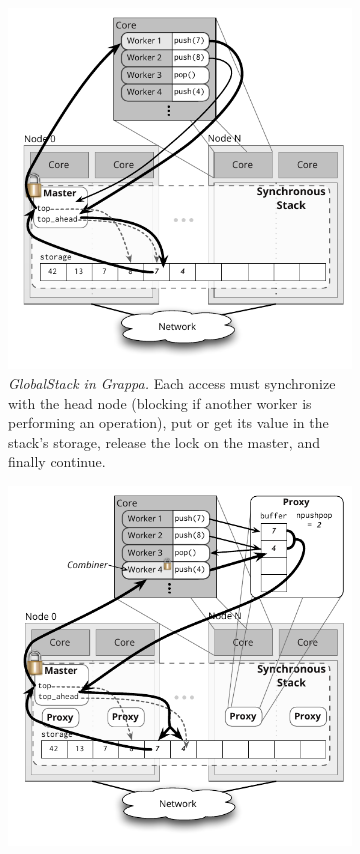 \begin{figure}[t]
  \centering
  \begin{subfigure}[b]{0.43\textwidth}
    \includegraphics[width=\textwidth]{figs/stack_nofc.pdf}
    \caption{\emph{GlobalStack in Grappa.} Each access must synchronize with the head node (blocking if another worker is performing an operation), put or get its value in the stack's storage, release the lock on the master, and finally continue.}
    \label{fig:stacknofc}
  \end{subfigure}%
  \hspace{0.05\textwidth}
  \begin{subfigure}[b]{0.43\textwidth}
    \centering
    \includegraphics[width=\textwidth]{figs/stack_fc.pdf}

\end{subfigure}
\end{figure}
